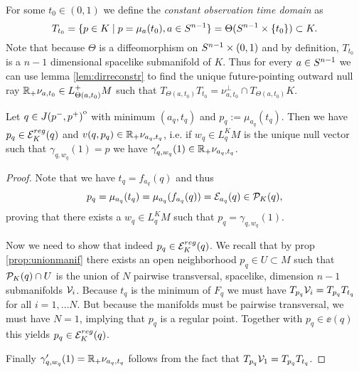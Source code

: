 \begin{definition}\label{def:constobstime} For some $t_0\in (0,1)$ we define the \emph{constant observation time domain} as 
\begin{equation}
    T_{t_0} = \{p\in K \mid p=\mu_a(t_0), a\in {S^{n-1}}\} = \Theta({S^{n-1}}\times \{t_0\}) \subset K.
\end{equation}
Note that because $\Theta$ is a diffeomorphism on ${S^{n-1}} \times (0,1)$ and by definition, $T_{t_0}$ is a $n-1$ dimensional spacelike submanifold of $K$. 
Thus for every $a\in {S^{n-1}}$ we can use lemma \ref{lem:dirreconstr} to find the unique future-pointing outward null ray $\mathbb{R}_+\nu_{a,t_0}\in L^+_{\Theta(a,t_0)}M$ such that $T_{\Theta(a,t_0)}T_{t_0} = \nu_{a,t_0}^\perp \cap T_{\Theta(a,t_0)}K$.
\end{definition}

\begin{lemma}\label{lem:amin}
    Let $q\in {\kern0ptJ(p^-,p^+)}^{\mathrm{o}}$ with minimum $(a_q,t_q)$ and $p_q:=\mu_{a_q}(t_q)$. Then we have $p_q\in {{\mathcal{E}}^{reg}_K}(q)$ and $v(q,p_q)\in \mathbb{R}_+\nu_{a_q,t_q}$, i.e. if $w_q\in L^K_qM$ is the unique null vector such that $\gamma_{q,w_q}(1)=p$ we have $\gamma'_{q,w_q}(1)\in \mathbb{R}_+\nu_{a_q,t_q}$.
\end{lemma}
\begin{proof}
    Note that we have $t_q = f_{a_q}(q)$ and thus 
    \[
        p_q =\mu_{a_q}(t_q) = \mu_{a_q}(f_{a_q}(q)) = {\mathcal{E}}_{a_q}(q)\in {{\mathcal{P}}_K(q)},
    \] proving that there exists a $w_q\in L^K_qM$ such that $p_q = \gamma_{q,w_q}(1)$. 

    Now we need to show that indeed $p_q\in {{\mathcal{E}}^{reg}_K}(q)$.
    We recall that by prop \ref{prop:unionmanif} there exists an open neighborhood $p_q\in U\subset M$ such that ${\mathcal{P}}_K(q)\cap U$ is the union of $N$ pairwise transversal, spacelike, dimension $n-1$ submanifolds ${\mathcal{V}}_i$. Because $t_q$ is the minimum of $F_q$ we must have $T_{p_q}{{\mathcal{V}}_i} = T_{p_q}{T_{t_q}}$ for all $i=1,\dots N$. But because the manifolds must be pairwise transversal, we must have $N=1$, implying that $p_q$ is a regular point. Together with $p_q\in \ee(q)$ this yields $p_q \in {{\mathcal{E}}^{reg}_K}(q)$.

    Finally $\gamma'_{q,w_q}(1)=\mathbb{R}_+\nu_{a_q,t_q}$ follows from the fact that $T_{p_q}{{\mathcal{V}}_1} = T_{p_q}{T_{t_q}}$.
\end{proof}


